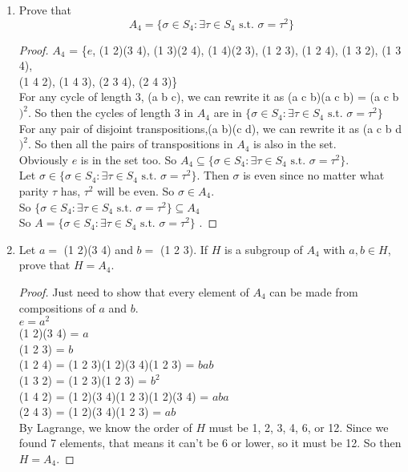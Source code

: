 \documentclass[12pt]{article}
\begin{document}
\begin{enumerate}
		\item Prove that \[A_4 = \{\sigma \in S_4 : \exists\tau\in S_4 \text{ s.t. }\sigma = \tau^2\}\]
		\begin{proof}
			$A_4$ = \{$e$, (1 2)(3 4), (1 3)(2 4), (1 4)(2 3), (1 2 3), (1 2 4), (1 3 2), (1 3 4),\\
			(1 4 2), (1 4 3), (2 3 4), (2 4 3)\}\\
			For any cycle of length 3, (a b c), we can rewrite it as (a c b)(a c b) = (a c b$)^2$. So then the cycles of length 3 in $A_4$ are in $\{\sigma \in S_4 : \exists\tau\in S_4 \text{ s.t. }\sigma = \tau^2\}$\\
			For any pair of disjoint transpositions,(a b)(c d), we can rewrite it as (a c b d$)^2$. So then all the pairs of transpositions in $A_4$ is also in the set.\\
			Obviously $e$ is in the set too. So $A_4 \subseteq \{\sigma \in S_4 : \exists\tau\in S_4 \text{ s.t. }\sigma = \tau^2\}$.\\
			Let $\sigma \in \{\sigma \in S_4 : \exists\tau\in S_4 \text{ s.t. }\sigma = \tau^2\}$. Then $\sigma$ is even since no matter what parity $\tau$ has, $\tau^2$ will be even. So $\sigma \in A_4$.\\
			So $\{\sigma \in S_4 : \exists\tau\in S_4 \text{ s.t. }\sigma = \tau^2\} \subseteq A_4$\\
			So $A = \{\sigma \in S_4 : \exists\tau\in S_4 \text{ s.t. }\sigma = \tau^2\}$
.		\end{proof}
		
		\item Let $a =$ (1 2)(3 4) and $b =$ (1 2 3). If $H$ is a subgroup of $A_4$ with $a,b \in H$, prove that $H = A_4$.
		\begin{proof}
			
			Just need to show that every element of $A_4$ can be made from compositions of $a$ and $b$.\\
			$e = a^2$\\
			(1 2)(3 4) = $a$\\
			(1 2 3) = $b$\\
			(1 2 4) = (1 2 3)(1 2)(3 4)(1 2 3) = $bab$\\
			(1 3 2) = (1 2 3)(1 2 3) = $b^2$\\
			(1 4 2) = (1 2)(3 4)(1 2 3)(1 2)(3 4) = $aba$\\
			(2 4 3) = (1 2)(3 4)(1 2 3) = $ab$\\
			By Lagrange, we know the order of $H$ must be 1, 2, 3, 4, 6, or 12. Since we found 7 elements, that means it can't be 6 or lower, so it must be 12. So then $H = A_4$.
		\end{proof}
		
	\end{enumerate}
\end{document}
